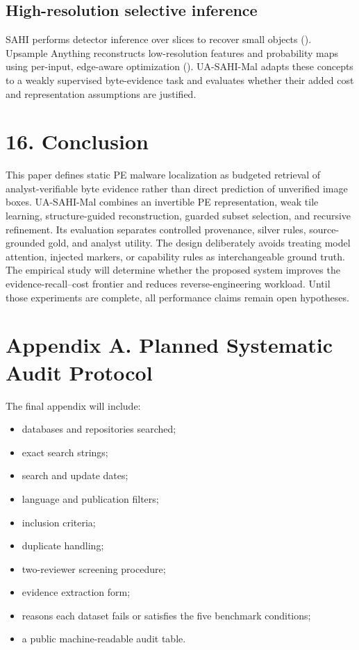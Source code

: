 \documentclass[
  10pt,
]{article}
\providecommand{\tightlist}{%
  \setlength{\itemsep}{0pt}\setlength{\parskip}{0pt}}
\begin{document}
\subsection{High-resolution selective
inference}\label{high-resolution-selective-inference}

SAHI performs detector inference over slices to recover small objects
().
Upsample Anything reconstructs low-resolution features and probability
maps using per-input, edge-aware optimization
().
UA-SAHI-Mal adapts these concepts to a weakly supervised byte-evidence
task and evaluates whether their added cost and representation
assumptions are justified.

\section{16. Conclusion}\label{conclusion}

This paper defines static PE malware localization as budgeted retrieval
of analyst-verifiable byte evidence rather than direct prediction of
unverified image boxes. UA-SAHI-Mal combines an invertible PE
representation, weak tile learning, structure-guided reconstruction,
guarded subset selection, and recursive refinement. Its evaluation
separates controlled provenance, silver rules, source-grounded gold, and
analyst utility. The design deliberately avoids treating model
attention, injected markers, or capability rules as interchangeable
ground truth. The empirical study will determine whether the proposed
system improves the evidence-recall--cost frontier and reduces
reverse-engineering workload. Until those experiments are complete, all
performance claims remain open hypotheses.

\section{Appendix A. Planned Systematic Audit
Protocol}\label{appendix-a.-planned-systematic-audit-protocol}

The final appendix will include:

\begin{itemize}
\tightlist
\item
  databases and repositories searched;
\item
  exact search strings;
\item
  search and update dates;
\item
  language and publication filters;
\item
  inclusion criteria;
\item
  duplicate handling;
\item
  two-reviewer screening procedure;
\item
  evidence extraction form;
\item
  reasons each dataset fails or satisfies the five benchmark conditions;
\item
  a public machine-readable audit table.
\end{itemize}
\end{document}
